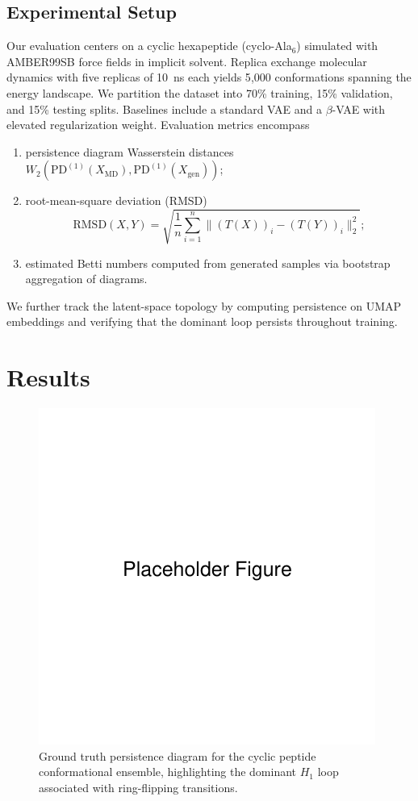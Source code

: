 \documentclass[11pt]{article}
\begin{document}
\subsection{Experimental Setup}
Our evaluation centers on a cyclic hexapeptide (cyclo-Ala$_6$) simulated with AMBER99SB force fields in implicit solvent. Replica exchange molecular dynamics with five replicas of 10~ns each yields 5{,}000 conformations spanning the energy landscape. We partition the dataset into 70\% training, 15\% validation, and 15\% testing splits. Baselines include a standard VAE and a $\beta$-VAE with elevated regularization weight. Evaluation metrics encompass
\begin{enumerate}[label=\roman*)]
    \item persistence diagram Wasserstein distances $W_{2}(\mathrm{PD}^{(1)}(X_{\text{MD}}), \mathrm{PD}^{(1)}(X_{\text{gen}}))$;
    \item root-mean-square deviation (RMSD)
    \begin{equation}
        \mathrm{RMSD}(X, Y) = \sqrt{\frac{1}{n} \sum_{i=1}^n \big\| (T(X))_i - (T(Y))_i \big\|_2^2};
        \label{eq:rmsd}
    \end{equation}
    \item estimated Betti numbers computed from generated samples via bootstrap aggregation of diagrams.
\end{enumerate}
We further track the latent-space topology by computing persistence on UMAP embeddings and verifying that the dominant loop persists throughout training.

\section{Results}
\begin{figure}[t]
    \centering
    \includegraphics[width=0.75\linewidth]{figures/placeholder.pdf}
    \caption{Ground truth persistence diagram for the cyclic peptide conformational ensemble, highlighting the dominant $H_1$ loop associated with ring-flipping transitions.}
    \label{fig:groundtruth_pd}
\end{figure}
\end{document}
